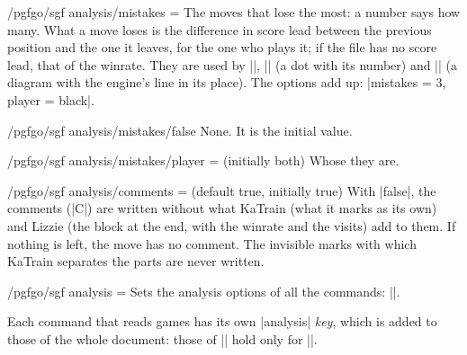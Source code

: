 \begin{key}{/pgfgo/sgf analysis/mistakes = }
	The moves that lose the most: a number says how many. What a move loses is the difference in score lead between the previous position and the one it leaves, for the one who plays it; if the file has no score lead, that of the winrate. They are used by ||, |\sgfgraph| (a dot with its number) and |\sgfdiagrams| (a diagram with the engine's line in its place). The options add up: |mistakes = {3, player = black}|.
\end{key}

\begin{stylekey}{/pgfgo/sgf analysis/mistakes/false}
	None. It is the initial value.
\end{stylekey}

\begin{key}{/pgfgo/sgf analysis/mistakes/player =  (initially both)}
	Whose they are.
\end{key}

\begin{key}{/pgfgo/sgf analysis/comments =  (default true, initially true)}
	With |false|, the comments (|C|) are written without what KaTrain (what it marks as its own) and Lizzie (the block at the end, with the winrate and the visits) add to them. If nothing is left, the move has no comment. The invisible marks with which KaTrain separates the parts are never written.

	\begin{codeexample}
	\end{codeexample}
\end{key}

\begin{key}{/pgfgo/sgf analysis = }
	Sets the analysis options of all the commands: ||.
\end{key}

Each command that reads games has its own |analysis| \emph{key}, which is added to those of the whole document: those of || hold only for |\sgfdiagrams|.

